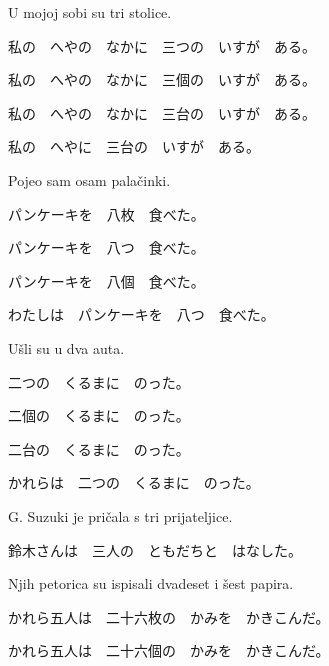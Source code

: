 
\author{Katja Kržišnik}

	
	     
	   \begin{mondai}{U mojoj sobi su tri stolice.}
	       	\item 私の　へやの　なかに　三つの　いすが　ある。
	       	\item 私の　へやの　なかに　三個の　いすが　ある。
	       	\item 私の　へやの　なかに　三台の　いすが　ある。
	       	\item 私の　へやに　三台の　いすが　ある。
	   \end{mondai}
    
        \begin{mondai}{Pojeo sam osam palačinki.}
       	    \item パンケーキを　八枚　食べた。
       	    \item パンケーキを　八つ　食べた。
       	    \item パンケーキを　八個　食べた。
       	    \item わたしは　パンケーキを　八つ　食べた。
       \end{mondai}
   
        \begin{mondai}{Ušli su u dva auta.}
       	    \item 二つの　くるまに　のった。
       	    \item 二個の　くるまに　のった。
       	    \item 二台の　くるまに　のった。
       	    \item かれらは　二つの　くるまに　のった。
       \end{mondai}
    
        \begin{mondai}{G. Suzuki je pričala s tri prijateljice.}
       	    \item 鈴木さんは　三人の　ともだちと　はなした。
       \end{mondai}
   
       \begin{mondai}{Njih petorica su ispisali dvadeset i šest papira.}
        	\item かれら五人は　二十六枚の　かみを　かきこんだ。
        	\item かれら五人は　二十六個の　かみを　かきこんだ。 
       \end{mondai}
   
